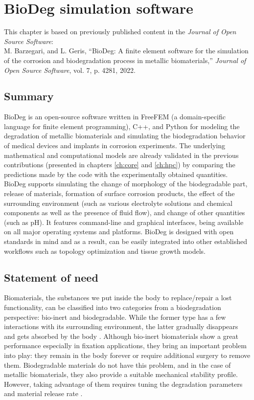 \chapter{BioDeg simulation software}\label{ch:biodeg}


\begin{shaded}
This chapter is based on previously published content in the \textit{Journal of Open Source Software}:\\
M. Barzegari, and L. Geris, ``BioDeg: A finite element software for the simulation of the corrosion and biodegradation process in metallic biomaterials,'' \textit{Journal of Open Source Software}, vol. 7, p. 4281, 2022.
\end{shaded}

\section{Summary}

BioDeg is an open-source software written in FreeFEM (a domain-specific language for finite element programming), C++, and Python for modeling the degradation of metallic biomaterials and simulating the biodegradation behavior of medical devices and implants in corrosion experiments. The underlying mathematical and computational models are already validated in the previous contributions \cite{Barzegari2021, Barzegari2022} (presented in chapters \ref{ch:core} and \ref{ch:hpc}) by comparing the predictions made by the code with the experimentally obtained quantities. BioDeg supports simulating the change of morphology of the biodegradable part, release of materials, formation of surface corrosion products, the effect of the surrounding environment (such as various electrolyte solutions and chemical components as well as the presence of fluid flow), and change of other quantities (such as pH). It features command-line and graphical interfaces, being available on all major operating systems and platforms. BioDeg is designed with open standards in mind and as a result, can be easily integrated into other established workflows such as topology optimization and tissue growth models.

\section{Statement of need}

Biomaterials, the substances we put inside the body to replace/repair a lost functionality, can be classified into two categories from a biodegradation perspective: bio-inert and biodegradable. While the former type has a few interactions with its surrounding environment, the latter gradually disappears and gets absorbed by the body \cite{Zheng2014, Chen2014}. Although bio-inert biomaterials show a great performance especially in fixation applications, they bring an important problem into play: they remain in the body forever or require additional surgery to remove them. Biodegradable materials do not have this problem, and in the case of metallic biomaterials, they also provide a suitable mechanical stability profile. However, taking advantage of them requires tuning the degradation parameters and material release rate \cite{Zhao2017}.

